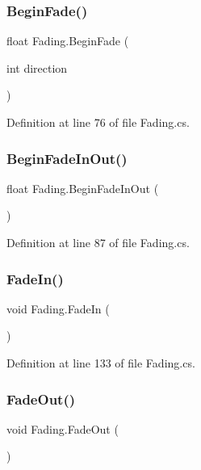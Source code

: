 \subsubsection{\texorpdfstring{Begin\+Fade()}{BeginFade()}\hspace{0.1cm}{\footnotesize\ttfamily [2/2]}}
{\footnotesize\ttfamily float Fading.\+Begin\+Fade (\begin{DoxyParamCaption}\item[{int}]{direction }\end{DoxyParamCaption})}



Definition at line 76 of file Fading.\+cs.

\mbox{\label{class_fading_ab7c586c60d0becec8731a5d273d5f8a4}} 
\subsubsection{\texorpdfstring{Begin\+Fade\+In\+Out()}{BeginFadeInOut()}}
{\footnotesize\ttfamily float Fading.\+Begin\+Fade\+In\+Out (\begin{DoxyParamCaption}{ }\end{DoxyParamCaption})}



Definition at line 87 of file Fading.\+cs.

\mbox{\label{class_fading_a1f3938e6d5871b57282dc2eef6f6a8b7}} 
\subsubsection{\texorpdfstring{Fade\+In()}{FadeIn()}}
{\footnotesize\ttfamily void Fading.\+Fade\+In (\begin{DoxyParamCaption}{ }\end{DoxyParamCaption})}



Definition at line 133 of file Fading.\+cs.

\mbox{\label{class_fading_a9447dc0ed62e9aa23683d54084bba9bf}} 
\subsubsection{\texorpdfstring{Fade\+Out()}{FadeOut()}}
{\footnotesize\ttfamily void Fading.\+Fade\+Out (\begin{DoxyParamCaption}{ }\end{DoxyParamCaption})}



